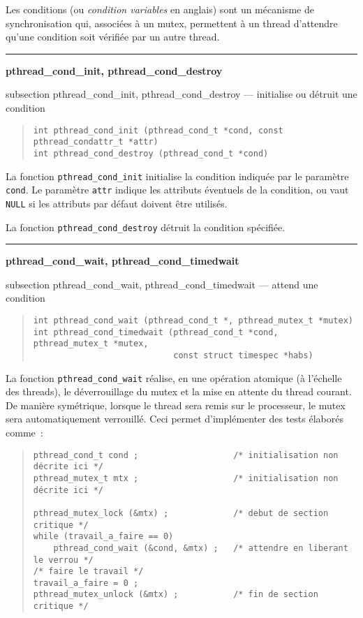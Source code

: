 \documentclass [twoside] {report}
\newcommand {\primitive} [1]
    {
	\phantomsection
	{\large \bf #1}
	\addcontentsline {toc} {subsection} {#1}
    }
\newcommand {\separation}
    {
	\vspace {5mm}
	\nopagebreak
	\hrule
    }
\begin{document}
Les conditions (ou \textit {condition variables} en anglais) sont un
mécanisme de synchronisation qui, associées à un mutex, permettent à
un thread d'attendre qu'une condition soit vérifiée par un autre thread.


\separation
\primitive {pthread\_cond\_init, pthread\_cond\_destroy} --- initialise ou détruit une condition

\begin {quote}
\begin {verbatim}
int pthread_cond_init (pthread_cond_t *cond, const pthread_condattr_t *attr)
int pthread_cond_destroy (pthread_cond_t *cond)
\end{verbatim}
\end {quote}

La fonction \verb|pthread_cond_init| initialise la condition indiquée
par le paramètre \texttt {cond}.  Le paramètre \texttt {attr} indique
les attributs éventuels de la condition, ou vaut \texttt {NULL} si les
attributs par défaut doivent être utilisés.

La fonction \verb|pthread_cond_destroy| détruit la condition spécifiée.


\separation
\primitive {pthread\_cond\_wait, pthread\_cond\_timedwait} --- attend une condition

\begin {quote}
\begin {verbatim}
int pthread_cond_wait (pthread_cond_t *, pthread_mutex_t *mutex)
int pthread_cond_timedwait (pthread_cond_t *cond, pthread_mutex_t *mutex,
                            const struct timespec *habs)
\end{verbatim}
\end {quote}

La fonction \verb|pthread_cond_wait| réalise, en une opération atomique
(à l'échelle des threads), le déverrouillage du mutex et la mise en
attente du thread courant. De manière symétrique, lorsque le thread
sera remis sur le processeur, le mutex sera automatiquement verrouillé.
Ceci permet d'implémenter des tests élaborés comme~:

\begin {quote}
\small
\begin {verbatim}
pthread_cond_t cond ;                   /* initialisation non décrite ici */
pthread_mutex_t mtx ;                   /* initialisation non décrite ici */

pthread_mutex_lock (&mtx) ;             /* debut de section critique */
while (travail_a_faire == 0)
    pthread_cond_wait (&cond, &mtx) ;   /* attendre en liberant le verrou */
/* faire le travail */
travail_a_faire = 0 ;
pthread_mutex_unlock (&mtx) ;           /* fin de section critique */
\end{verbatim}
\end {quote}
\end{document}
